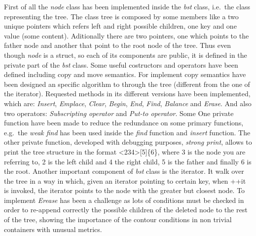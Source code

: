 First of all the \emph{node} class has been implemented inside the
\emph{bst} class, i.e.~the class representing the tree. The class tree is composed by some members like a two unique pointers which refers left and right possible children, one key and one value (some content). Aditionally there are two pointers, one which points to the father node and another that point to the root node of the tree. Thus even though
\emph{node} is a struct, so each of its components are public, it is
defined in the private part of the \emph{bst} class. \newline Some useful costructors and operators have been defined including copy and move semantics. For implement copy semantics have been designed an specific algorithm to through the tree (different from the one of the iterator). Requested methods in its different versions have been implemented, which are: \emph{Insert},
\emph{Emplace}, \emph{Clear}, \emph{Begin}, \emph{End}, \emph{Find},
\emph{Balance} and \emph{Erase}. And also two operators:
\emph{Subscripting operator} and \emph{Put-to operator}. \newline Some
One private function have been made to reduce the redundance on some
primary functions, e.g.~the \emph{weak find} has been used inside the
\emph{find} function and \emph{insert} function. \newline The other private function, developed with debugging purposes, \emph{strong print},
allows to print the tree structure in the format
\textless{}2\textbar{}3\textbar{}4\textgreater{}{[}5{]}\{6\}, where 3 is
the node you are referring to, 2 is the left child and 4 the right
child, 5 is the father and finally 6 is the root. \newline Another important component of \emph{bst} class is the iterator. It walk over the tree in a way in which, given an iterator pointing to certain key, when ++it is invoked, the iterator points to the node with the greater but closest node. \newline To implement \emph{Erease} has been a challenge as lots of conditions must be checked in order to re-append correctly the possible children of the deleted node to the rest of the tree, showing the importance of the contour conditions in non trivial containers with unusual metrics.



